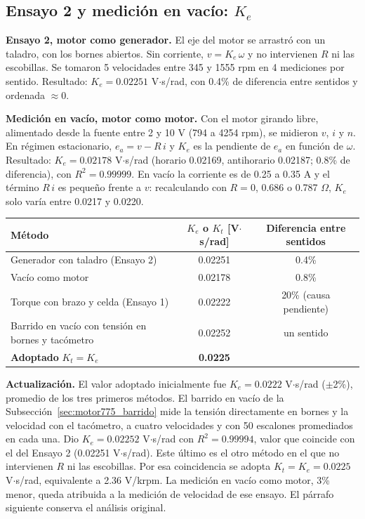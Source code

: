 \subsection{Ensayo 2 y medición en vacío: $K_e$}
\label{sec:motor775_ke}
\textbf{Ensayo 2, motor como generador.} El eje del motor se arrastró con un taladro, con los bornes abiertos. Sin corriente, $v = K_e\,\omega$ y no intervienen $R$ ni las escobillas. Se tomaron 5 velocidades entre 345 y 1555 rpm en 4 mediciones por sentido. Resultado: $K_e = 0.02251$ V$\cdot$s/rad, con 0.4\% de diferencia entre sentidos y ordenada $\approx 0$.

\textbf{Medición en vacío, motor como motor.} Con el motor girando libre, alimentado desde la fuente entre 2 y 10 V (794 a 4254 rpm), se midieron $v$, $i$ y $n$. En régimen estacionario, $e_a = v - R\,i$ y $K_e$ es la pendiente de $e_a$ en función de $\omega$. Resultado: $K_e = 0.02178$ V$\cdot$s/rad (horario 0.02169, antihorario 0.02187; 0.8\% de diferencia), con $R^2 = 0.99999$. En vacío la corriente es de 0.25 a 0.35 A y el término $R\,i$ es pequeño frente a $v$: recalculando con $R = 0$, 0.686 o 0.787 $\Omega$, $K_e$ solo varía entre 0.0217 y 0.0220.

\begin{center}
\begin{tabular}{lcc}\toprule
Método & $K_e$ o $K_t$ [V$\cdot$s/rad] & Diferencia entre sentidos\\\midrule
Generador con taladro (Ensayo 2) & 0.02251 & 0.4\%\\
Vacío como motor & 0.02178 & 0.8\%\\
Torque con brazo y celda (Ensayo 1) & 0.02222 & 20\% (causa pendiente)\\
Barrido en vacío con tensión en bornes y tacómetro & 0.02252 & un sentido\\\midrule
\textbf{Adoptado} $K_t = K_e$ & \textbf{0.0225} & \\\bottomrule
\end{tabular}
\end{center}

\textbf{Actualización.} El valor adoptado inicialmente fue $K_e = 0.0222$ V$\cdot$s/rad ($\pm$2\%), promedio de los tres primeros métodos. El barrido en vacío de la Subsección~\ref{sec:motor775_barrido} mide la tensión directamente en bornes y la velocidad con el tacómetro, a cuatro velocidades y con 50 escalones promediados en cada una. Dio $K_e = 0.02252$ V$\cdot$s/rad con $R^2 = 0.99994$, valor que coincide con el del Ensayo 2 (0.02251 V$\cdot$s/rad). Este último es el otro método en el que no intervienen $R$ ni las escobillas. Por esa coincidencia se adopta $K_t = K_e = 0.0225$ V$\cdot$s/rad, equivalente a 2.36 V/krpm. La medición en vacío como motor, 3\% menor, queda atribuida a la medición de velocidad de ese ensayo. El párrafo siguiente conserva el análisis original.

